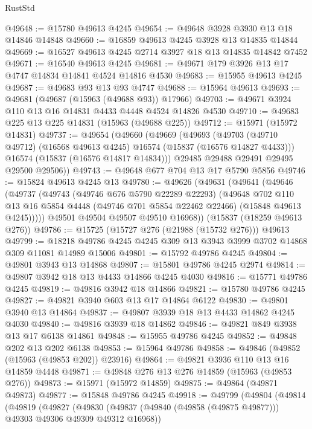 \begin{lexlean}{RustStd}
\begin{coremodule}
{\begin{coremodule}
{{{{{{{{{{{{{{{{{{{{{{{{{{{{{{{{{{{{{{{{{{{{{{{{{{{{{{{{{{{{@49648 := @15780 @49613 @4245
@49654 := @49648 @3928 @3930 @13 @18 @14846 @14848
@49660 := @16859 @49613 @4245 @3928 @13 @14835 @14844
@49669 := @16527 @49613 @4245 @2714 @3927 @18 @13 @14835 @14842 @7452
@49671 := @16540 @49613 @4245
@49681 := @49671 @179 @3926 @13 @17 @4747 @14834 @14841 @4524 @14816 @4530
@49683 := @15955 @49613 @4245
@49687 := @49683 @93 @13 @93 @4747
@49688 := @15964 @49613
@49693 := @49681 (@49687 (@15963 (@49688 @93)) @17966)
@49703 := @49671 @3924 @110 @13 @16 @14831 @4433 @4448 @4524 @14826 @4530
@49710 := @49683 @225 @13 @225 @14831 (@15963 (@49688 @225))
@49712 := @15971 (@15972 @14831)
@49737 := @49654
    (@49660
      (@49669
        (@49693
          (@49703 (@49710 @49712) (@16568 @49613 @4245) @16574 (@15837 (@16576 @14827 @4433)))
          @16574
          (@15837 (@16576 @14817 @14834)))
        @29485
        @29488
        @29491
        @29495
        @29500
        @29506))
@49743 := @49648 @677 @704 @13 @17 @5790 @5856
@49746 := @15824 @49613 @4245 @13
@49780 := @49626
    (@49631
      (@49641
        (@49646
          (@49737
            (@49743
              (@49746 @676 @5790 @22289 @22293)
              (@49648
                @702
                @110
                @13
                @16
                @5854
                @4448
                (@49746 @701 @5854 @22462 @22466)
                (@15848 @49613 @4245)))))
        @49501
        @49504
        @49507
        @49510
        @16968))
    (@15837 (@18259 @49613 @276))
@49786 := @15725 (@15727 @276 (@21988 (@15732 @276))) @49613
@49799 := @18218 @49786 @4245 @4245 @309 @13 @3943 @3999 @3702 @14868 @309 @11081 @14989 @15006
@49801 := @15792 @49786 @4245
@49804 := @49801 @3943 @13 @14868
@49807 := @15801 @49786 @4245 @2974
@49814 := @49807 @3942 @18 @13 @4433 @14866 @4245 @4030
@49816 := @15771 @49786 @4245
@49819 := @49816 @3942 @18 @14866
@49821 := @15780 @49786 @4245
@49827 := @49821 @3940 @603 @13 @17 @14864 @6122
@49830 := @49801 @3940 @13 @14864
@49837 := @49807 @3939 @18 @13 @4433 @14862 @4245 @4030
@49840 := @49816 @3939 @18 @14862
@49846 := @49821 @849 @3938 @13 @17 @6138 @14861
@49848 := @15955 @49786 @4245
@49852 := @49848 @202 @13 @202 @6138
@49853 := @15964 @49786
@49858 := @49846 (@49852 (@15963 (@49853 @202)) @23916)
@49864 := @49821 @3936 @110 @13 @16 @14859 @4448
@49871 := @49848 @276 @13 @276 @14859 (@15963 (@49853 @276))
@49873 := @15971 (@15972 @14859)
@49875 := @49864 (@49871 @49873)
@49877 := @15848 @49786 @4245
@49918 := @49799
    (@49804
      (@49814
        (@49819
          (@49827
            (@49830 (@49837 (@49840 (@49858 (@49875 @49877))) @49303 @49306 @49309 @49312 @16968))
}}}}}}}}}}}}}}}}}}}}}}}}}}}}}}}}}}}}}}}}}}}}}}}}}}}}}}}}}}}}
\end{coremodule}}
\end{coremodule}
\end{lexlean}
